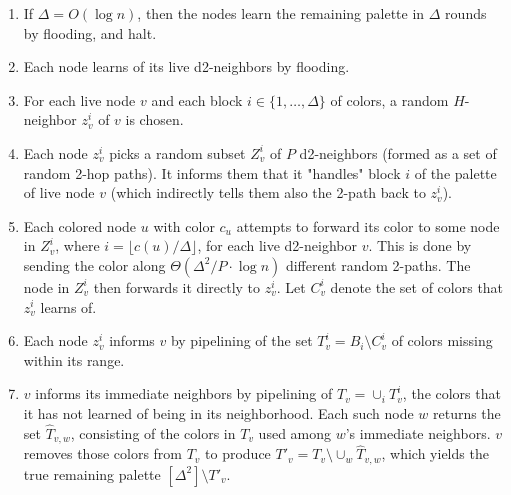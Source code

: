 \begin{enumerate}
  \item If $\Delta = O(\log n)$, then the nodes learn the remaining palette in $\Delta$ rounds by flooding, and halt.
  \item Each node learns of its live d2-neighbors by flooding.
  \item For each live node $v$ and each block $i \in \{1,\ldots, \Delta\}$ of colors, a random $H$-neighbor $z^i_v$ of $v$ is chosen.
  \item Each node $z^i_v$ picks a random subset $Z_v^i$ of $P$ d2-neighbors (formed as a set of random 2-hop paths).
  It informs them that it "handles" block $i$ of the palette of live node $v$ (which indirectly tells them also the 2-path back to $z^i_v$). 
  \item Each colored node $u$ with color $c_u$ attempts to forward its color to some node in $Z_v^i$, where $i = \lfloor c(u) / \Delta \rfloor$, for each live d2-neighbor $v$. 
  This is done by sending the color along $\Theta(\Delta^2/P \cdot \log n)$ different random 2-paths. The node in $Z_v^i$ then forwards it directly to $z^i_v$. Let $C^i_v$ denote the set of colors that $z^i_v$ learns of.
  \item Each node $z_v^i$ informs $v$ by pipelining of the set $T_v^i = B_i \setminus C_v^i$ of colors missing within its range. 
  \item $v$ informs its immediate neighbors by pipelining of $T_v= \cup_i T_v^i$, the colors that it has not learned of being in its neighborhood. Each such node $w$ returns the set $\hat{T}_{v,w}$, consisting of the colors in $T_v$ used among $w$'s immediate neighbors. $v$ removes those colors from $T_v$ to produce $T'_v = T_v \setminus \cup_w \hat{T}_{v,w}$, which yields the true remaining palette $[\Delta^2] \setminus T'_{v}$.
\end{enumerate}
 \medskip
 

